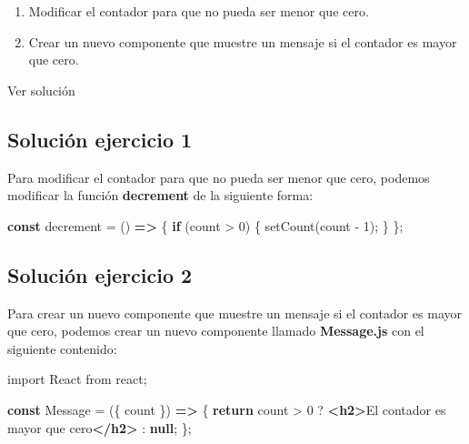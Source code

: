 \documentclass[
  a4paper,
  DIV=11,
  numbers=noendperiod,
  onepage,
  openany]{scrreprt}
\newenvironment{Shaded}{\begin{snugshade}}{\end{snugshade}}
\newcommand{\ControlFlowTok}[1]{\textcolor[rgb]{0.00,0.23,0.31}{\textbf{#1}}}
\newcommand{\DecValTok}[1]{\textcolor[rgb]{0.68,0.00,0.00}{#1}}
\newcommand{\FunctionTok}[1]{\textcolor[rgb]{0.28,0.35,0.67}{#1}}
\newcommand{\ImportTok}[1]{\textcolor[rgb]{0.00,0.46,0.62}{#1}}
\newcommand{\KeywordTok}[1]{\textcolor[rgb]{0.00,0.23,0.31}{\textbf{#1}}}
\newcommand{\NormalTok}[1]{\textcolor[rgb]{0.00,0.23,0.31}{#1}}
\newcommand{\OperatorTok}[1]{\textcolor[rgb]{0.37,0.37,0.37}{#1}}
\newcommand{\StringTok}[1]{\textcolor[rgb]{0.13,0.47,0.30}{#1}}
\providecommand{\tightlist}{%
  \setlength{\itemsep}{0pt}\setlength{\parskip}{0pt}}\usepackage{longtable,booktabs,array}
\begin{document}
\begin{tcolorbox}
\begin{enumerate}
\def\labelenumi{\arabic{enumi}.}
\tightlist
\item
  Modificar el contador para que no pueda ser menor que cero.
\item
  Crear un nuevo componente que muestre un mensaje si el contador es
  mayor que cero.
\end{enumerate}

Ver solución

\subsection{Solución ejercicio 1}\label{soluciuxf3n-ejercicio-1}

Para modificar el contador para que no pueda ser menor que cero, podemos
modificar la función \textbf{decrement} de la siguiente forma:

\begin{Shaded}
\begin{Highlighting}[]
\KeywordTok{const}\NormalTok{ decrement }\OperatorTok{=}\NormalTok{ () }\KeywordTok{=\textgreater{}}\NormalTok{ \{}
  \ControlFlowTok{if}\NormalTok{ (count }\OperatorTok{\textgreater{}} \DecValTok{0}\NormalTok{) \{}
    \FunctionTok{setCount}\NormalTok{(count }\OperatorTok{{-}} \DecValTok{1}\NormalTok{)}\OperatorTok{;}
\NormalTok{  \}}
\NormalTok{\}}\OperatorTok{;}
\end{Highlighting}
\end{Shaded}

\subsection{Solución ejercicio 2}\label{soluciuxf3n-ejercicio-2}

Para crear un nuevo componente que muestre un mensaje si el contador es
mayor que cero, podemos crear un nuevo componente llamado
\textbf{Message.js} con el siguiente contenido:

\begin{Shaded}
\begin{Highlighting}[]
\ImportTok{import}\NormalTok{ React }\ImportTok{from} \StringTok{\textquotesingle{}react\textquotesingle{}}\OperatorTok{;}

\KeywordTok{const}\NormalTok{ Message }\OperatorTok{=}\NormalTok{ (\{ count \}) }\KeywordTok{=\textgreater{}}\NormalTok{ \{}
  \ControlFlowTok{return}\NormalTok{ count }\OperatorTok{\textgreater{}} \DecValTok{0} \OperatorTok{? }\KeywordTok{\textless{}h2\textgreater{}}\NormalTok{El contador es mayor que cero}\KeywordTok{\textless{}/h2\textgreater{}} \OperatorTok{:} \KeywordTok{null}\OperatorTok{;}
\NormalTok{\}}\OperatorTok{;}


\end{Highlighting}
\end{Shaded}
\end{tcolorbox}
\end{document}
